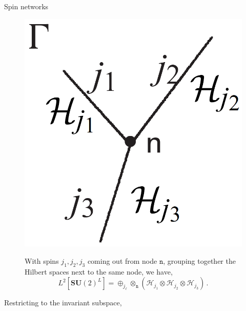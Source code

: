 \documentclass[12pt,titlepage]{article}
\begin{document}
\begin{frame}{Spin networks}
    \begin{list}{\,}{\leftmargin=1em \itemindent=0em}
        \item<1-> \noindent\FloatBarrier
        \begin{figure}[!ht]
            \begin{minipage}{0.15\linewidth}
                \includegraphics[width=\linewidth]{4.11.png}
            \end{minipage}
            \begin{minipage}{0.85\linewidth}
                With spins $j_1,j_2,j_3$ coming out from node $\mathtt{n}$, grouping together the Hilbert spaces next to the same node, we have,
                \begin{equation}
                    L^2[{\mathbf{SU}(2)}^L]=\oplus_{j_\ell}\otimes_\mathtt{n}(\mathcal{H}_{j_1}\otimes\mathcal{H}_{j_2}\otimes\mathcal{H}_{j_3})\,.
                \end{equation}
            \end{minipage}
        \end{figure}\FloatBarrier
        \item<2-> Restricting to the invariant subspace,
        \begin{equation}

\end{equation}
\end{list}
\end{frame}
\end{document}
